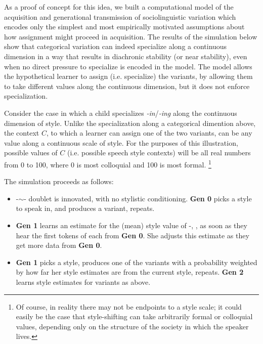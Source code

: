 As a proof of concept for this idea, we built a computational model of the acquisition and generational transmission of sociolinguistic variation which encodes only the simplest and most empirically motivated assumptions about how assignment might proceed in acquisition.
The results of the simulation below show that categorical variation can indeed specialize along a continuous dimension in a way that results in diachronic stability (or near stability), even when no direct pressure to specialize is encoded in the model.
The model allows the hypothetical learner to assign (i.e. specialize) the variants, by allowing them to take different values along the continuous dimension, but it does not enforce specialization.

Consider the case in which a child specializes \textsl{-in}/\textsl{-ing} along the continuous dimension of style.
Unlike the specialization along a categorical dimention above, the context $C$, to which a learner can assign one of the two variants, can be any value along a continuous scale of style.
For the purposes of this illustration, possible values of $C$ (i.e. possible speech style contexts) will be all real numbers from 0 to 100, where 0 is most colloquial and 100 is most formal.
\footnote{Of course, in reality there may not be endpoints to a style scale; it could easily be the case that style-shifting can take arbitrarily formal or colloquial values, depending only on the structure of the society in which the speaker lives.}

The simulation proceeds as follows:

\begin{itemize}
		\item[\textbf{Gen 0:}]  -$\sim$- doublet is innovated, with no stylistic conditioning. \textbf{Gen 0} picks a style to speak in, and produces a variant, repeats. 
		\item[\textbf{Gen 1:}]  \textbf{Gen 1} learns an estimate for the (mean) style value of -, , as soon as they hear the first tokens of each from \textbf{Gen 0}. She adjusts this estimate as they get more data from \textbf{Gen 0}.
		\item[\textbf{Gen 2:}] \textbf{Gen 1} picks a style, produces one of the variants with a probability weighted by how far her style estimates are from the current style, repeats. \textbf{Gen 2} learns style estimates for variants as above.
\end{itemize}


